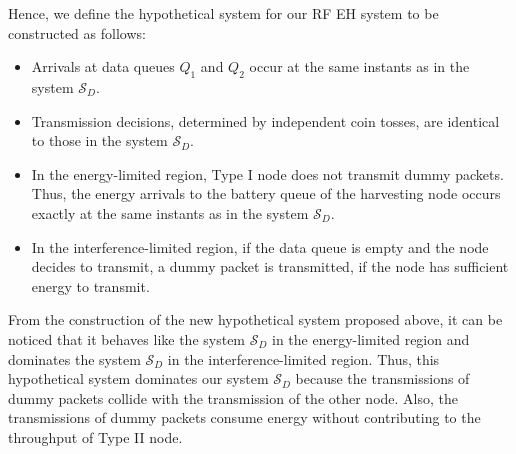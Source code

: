 \documentclass[draftcls,12pt,onecolumn]{IEEEtran}
\begin{document}
Hence, we define the hypothetical system for our RF EH system to be constructed as follows: 
\begin{itemize}
\item Arrivals at data queues $Q_1$ and $Q_2$ occur at the same instants as in the system $\mathcal{S}_D$.
\item Transmission decisions, determined by independent coin tosses, are identical to those in the system $\mathcal{S}_D$.
\item In the energy-limited region, Type I node does not transmit dummy packets. Thus, the energy arrivals to the battery queue of the harvesting node occurs exactly at the same instants as in the system $\mathcal{S}_D$.
\item In the interference-limited region, if the data queue is empty and the node decides to transmit, a dummy packet is transmitted, if the node has sufficient energy to transmit.  
\end{itemize}

\indent From the construction of the new hypothetical system proposed above, it can be noticed that it behaves like the system $\mathcal{S}_D$ in the energy-limited region and dominates the system $\mathcal{S}_D$ in the interference-limited region. Thus, this hypothetical system dominates our system $\mathcal{S}_D$ because the transmissions of dummy packets collide with the transmission of the other node. Also, the transmissions of dummy packets consume energy without contributing to the throughput of Type II node.
\vspace{-0.15in}
\end{document}
